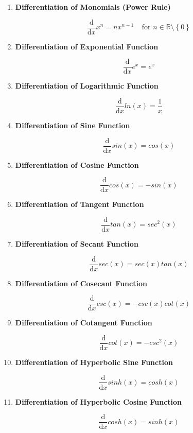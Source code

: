 \documentclass[a4paper,12pt]{article}
\newcommand{\R}{\mathbb{R}}
\newcommand{\diff}{\mathrm{d}}
\newenvironment{alist}{ %
\begin{enumerate}[label=(\alph*)]
}{
\end{enumerate}
}
\begin{document}
\begin{alist}
  \item \textbf{Differentiation of Monomials (Power Rule)}

  $$\frac{\diff }{\diff  x}x^{n}=nx^{n-1}\;\;\;\;\text{for }n\in\R\setminus \left\{ 0\right\}$$

  \item \textbf{Differentiation of Exponential Function}

  $$\frac{\diff }{\diff  x}e^{x}=e^{x}$$

  \item \textbf{Differentiation of Logarithmic Function}

  $$\frac{\diff }{\diff  x}ln(x)=\frac{1}{x}$$

  \item \textbf{Differentiation of Sine Function}

  $$\frac{\diff }{\diff  x}sin(x)=cos(x)$$

  \item \textbf{Differentiation of Cosine Function}

  $$\frac{\diff }{\diff  x}cos(x)=-sin(x)$$

  \item \textbf{Differentiation of Tangent Function}

  $$\frac{\diff }{\diff  x}tan(x)=sec^{2}(x)$$

  \item \textbf{Differentiation of Secant Function}

  $$\frac{\diff }{\diff  x}sec(x)=sec(x)tan(x)$$

  \item \textbf{Differentiation of Cosecant Function}

  $$\frac{\diff }{\diff  x}csc(x)=-csc(x)cot(x)$$

  \item \textbf{Differentiation of Cotangent Function}

  $$\frac{\diff }{\diff  x}cot(x)=-csc^{2}(x)$$

  \item \textbf{Differentiation of Hyperbolic Sine Function}

  $$\frac{\diff }{\diff  x}sinh(x)=cosh(x)$$

  \item \textbf{Differentiation of Hyperbolic Cosine Function}

  $$\frac{\diff }{\diff  x}cosh(x)=sinh(x)$$
\end{alist}
\end{document}
